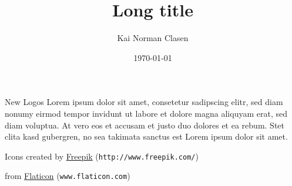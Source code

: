 \documentclass[aspectratio=169]{beamer}
\title[New Logo]{Long title}
\author{Kai Norman Clasen}
\institute{}
\date{\today}
\begin{document}
  \begin{frame}{New Logos}
    Lorem ipsum dolor sit amet, consetetur sadipscing elitr,
    sed diam nonumy eirmod tempor invidunt ut labore et dolore
    magna aliquyam erat, sed diam voluptua.
    At vero eos et accusam et justo duo dolores et ea rebum.
    Stet clita kasd gubergren, no sea takimata sanctus est
    Lorem ipsum dolor sit amet.

    \vfill
    Icons created by \href{http://www.freepik.com/}{Freepik}
    (\texttt{http://www.freepik.com/})

    from \href{www.flaticon.com}{Flaticon} (\texttt{www.flaticon.com})
  \end{frame}
\end{document}
